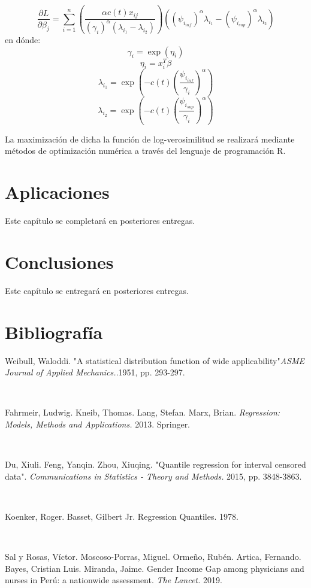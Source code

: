 \documentclass{report}
\begin{document}
\[\frac{\partial L}{\partial \beta_{j}}=\sum_{i=1}^{n} \left(\frac{\alpha c(t) x_{ij}}{(\gamma_{i})^{\alpha}(\lambda_{i_{1}}-\lambda_{i_{2}})}\right) \left( (\psi_{i_{inf}})^{\alpha}\lambda_{i_{1}} - (\psi_{i_{sup}})^{\alpha} \lambda_{i_{2}} \right)\]
\noindent en dónde:
\[ \gamma_{i} = \exp(\eta_{i})\]
\[ \eta_{i} = x_{i}^{T}\beta\]
\[ \lambda_{i_{1}} = \exp\left( -c(t) \left(\frac{\psi_{i_{inf}}}{\gamma_{i}}\right)^{\alpha} \right)\]
\[ \lambda_{i_{2}} = \exp\left( -c(t) \left(\frac{\psi_{i_{sup}}}{\gamma_{i}}\right)^{\alpha} \right)\]

La maximización de dicha la función de log-verosimilitud se realizará mediante métodos de optimización numérica a través del lenguaje de programación R.
	
\chapter{Aplicaciones}

Este capítulo se completará en posteriores entregas.

\chapter{Conclusiones}

Este capítulo se entregará en posteriores entregas.
\chapter{Bibliografía}


Weibull, Waloddi. "A statistical distribution function of wide applicability"\textit{ASME Journal of Applied Mechanics.}.1951, pp. 293-297.

\

Fahrmeir, Ludwig. Kneib, Thomas. Lang, Stefan. Marx, Brian. \textit{Regression: Models, Methods and Applications.} 2013. Springer.

\

Du, Xiuli. Feng, Yanqin. Zhou, Xiuqing. "Quantile regression for interval censored data". \textit{Communications in Statistics - Theory and Methods.} 2015, pp. 3848-3863.

\

Koenker, Roger. Basset, Gilbert Jr. Regression Quantiles. 1978.

\

Sal y Rosas, Víctor. Moscoso-Porras, Miguel. Ormeño, Rubén. Artica, Fernando. Bayes, Cristian Luis. Miranda, Jaime. Gender Income Gap among physicians and nurses in Perú: a nationwide assessment. \textit{The Lancet.} 2019.
\end{document}
